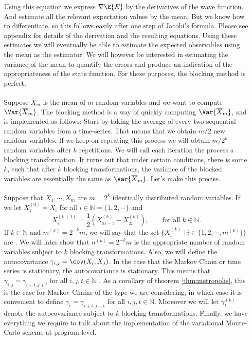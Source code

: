 \documentclass[11pt,english,a4paper]{article}
\begin{document}
Using this equation we express $\nabla \E{E}$ by the derivatives of the wave function. And estimate all the relevant expectation values by the mean. But we know how to differentiate, so this follows easily after one step of Jacobi's formula. Please see appendix for details of the derivation and the resulting equations. Using these estimates we will eventually be able to estimate the expected observables using the mean as the estimator. We will however be interested in estimating the variance of the mean to quantify the errors and produce an indication of the appropriateness of the state function. For these purposes, the blocking method is perfect.\\
\\
Suppose $\overline X_m$ is the mean of $m$ random variables and we want to compute $\Var{\overline X_m}$. The blocking method is a way of quickly computing $\Var{\overline X_m}$, and is implemented as follows: Start by taking the average of every two sequential random variables from a time-series. That means that we obtain $m/2$ new random variables. If we keep on repeating this process we will obtain $m/2^k$ random variables after $k$ repetitions. We will call each iteration the process a blocking transformation. It turns out that under certain conditions, there is some $k$, such that after $k$ blocking transformations, the variance of the blocked variables are essentially the same as $\Var{\overline X_m}$. Let's make this precise.\\
\\
Suppose that $X_1, \cdots, X_m$ are $m = 2^k$ identically distributed random variables. If we let $X^{(0)}_i = X_i$ for all $i \in \mathbb{N} = \{1,2,\cdots\}$ and
\[
X_i^{(k+1)} = \frac{1}{2} \left( X_{2i-1}^{(k)} + X_{2i}^{(k)} \right), \qquad \text{for all $k \in \mathbb{N}$}.
\]
If $k \in \mathbb{N}$ and $m^{(k)} = 2^{-k}m$, we will say that the set $\{X^{(k)}_i \;|\; i \in \{1,2,\cdots, m^{(k)}\}\}$ are . We will later show that $n^{(k)} = 2^{-k}m$ is the appropriate number of random variables subject to $k$ blocking transformations. Also, we will define the autocovariance $\gamma_{i,j} = \cov (X_i,X_j)$. In the case that the Markov Chain or time series is stationary, the autocovariance is stationary. This means that $\gamma_{i,j}  = \gamma_{i+t,j+t}$ for all $i,j,t \in \mathbb{N}$ \parencite[24]{shumway_time_2011}. As a corollary of theorem \ref{thm:metropolis}, this is the case for Markov Chains of the type we are considering, in which case it is convenient to define $\gamma_t = \gamma_{i+t,j+t}$ for all $i,j,t \in \mathbb{N}$. Moreover we will let $\gamma^{(k)}_t$ denote the autocovariance subject to $k$ blocking transformations. Finally, we have everything we require to talk about the implementation of the variational Monte-Carlo scheme at program level.\\
\end{document}
